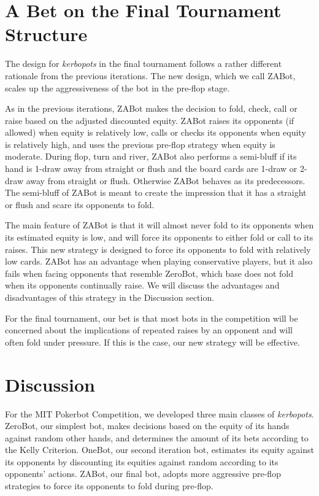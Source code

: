 \documentclass[11pt, oneside]{article}   	%
\begin{document}
\section{A Bet on the Final Tournament Structure}

The design for \emph{kerbopots} in the final tournament follows a rather different rationale from the previous iterations. The new design, which we call ZABot, scales up the aggressiveness of the bot in the pre-flop stage.

As in the previous iterations, ZABot makes the decision to fold, check, call or raise based on the adjusted discounted equity. ZABot raises its opponents (if allowed) when equity is relatively low, calls or checks its opponents when equity is relatively high, and uses the previous pre-flop strategy when equity is moderate. During flop, turn and river, ZABot also performs a semi-bluff if its hand is 1-draw away from straight or flush and the board cards are 1-draw or 2-draw away from straight or flush. Otherwise ZABot behaves as its predecessors. The semi-bluff of ZABot is meant to create the impression that it has a straight or flush and scare its opponents to fold.

The main feature of ZABot is that it will almost never fold to its opponents when its estimated equity is low, and will force its opponents to either fold or call to its raises. This new strategy is designed to force its opponents to fold with relatively low cards. ZABot has an advantage when playing conservative players, but it also fails when facing opponents that resemble ZeroBot, which base does not fold when its opponents continually raise. We will discuss the advantages and disadvantages of this strategy in the Discussion section.

For the final tournament, our bet is that most bots in the competition will be concerned about the implications of repeated raises by an opponent and will often fold under pressure. If this is the case, our new strategy will be effective.

\section{Discussion}

For the MIT Pokerbot Competition, we developed three main classes of \emph{kerbopots}. ZeroBot, our simplest bot, makes decisions based on the equity of its hands against random other hands, and determines the amount of its bets according to the Kelly Criterion. OneBot, our second iteration bot, estimates its equity against its opponents by discounting its equities against random according to its opponents' actions. ZABot, our final bot, adopts more aggressive pre-flop strategies to force its opponents to fold during pre-flop.
\end{document}
